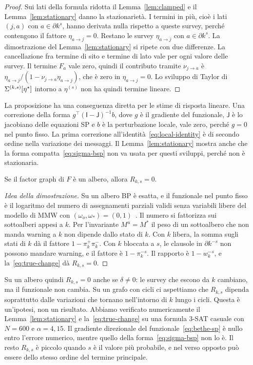 \begin{proof}
Sui lati della formula ridotta il Lemma~\ref{lem:clamped} e il Lemma~\ref{lem:stationary} danno la stazionarietà.
I termini in più, cioè i lati $(j,a)$ con $a\in\partial k^{s}$, hanno derivata nulla rispetto a queste survey, perché contengono il fattore $\eta_{a\to j}=0$.
Restano le survey $\eta_{a\to j}$ con $a\in\partial k^{s}$.
La dimostrazione del Lemma~\ref{lem:stationary} si ripete con due differenze.
La cancellazione fra termine di sito e termine di lato vale per ogni valore delle survey.
Il termine $F_a$ vale zero, quindi il contributo tramite $\nu_{j\to a}$ è $\eta_{a\to j}/(1-\nu_{j\to a}\eta_{a\to j})$, che è zero in $\eta_{a\to j}=0$.
Lo sviluppo di Taylor di $\Sigma^{(k,s)}[\eta^\star]$ intorno a $\eta^{(s)}$ non ha quindi termine lineare.
\end{proof}

La proposizione ha una conseguenza diretta per le stime di risposta lineare.
Una correzione della forma $g^{\top}(\mathsf I-\mathsf J)^{-1}b$, dove $g$ è il gradiente del funzionale, $\mathsf J$ è lo jacobiano delle equazioni SP e $b$ è la perturbazione locale, vale zero, perché $g=0$ nel punto fisso.
La prima correzione all'identità~\eqref{eq:local-identity} è di secondo ordine nella variazione dei messaggi.
Il Lemma~\ref{lem:stationary} mostra anche che la forma compatta~\eqref{eq:sigma-bsp} non va usata per questi sviluppi, perché non è stazionaria.

\begin{corollario}[Alberi]
\label{cor:tree}
Se il factor graph di $F$ è un albero, allora $R_{k,s}=0$.
\end{corollario}

\begin{proof}[Idea della dimostrazione]
Su un albero BP è esatta, e il funzionale nel punto fisso è il logaritmo del numero di assegnamenti parziali validi senza variabili libere del modello di MMW con $(\omega_o,\omega_*)=(0,1)$~\citep{braunstein2004surveybp,maneva2007survey}.
Il numero si fattorizza sui sottoalberi appesi a $k$.
Per l'invariante $M^u=M^*$ il peso di un sottoalbero che non manda warning a $k$ non dipende dallo stato di $k$.
Con $k$ libera, la somma sugli stati di $k$ dà il fattore $1-\pi_k^+\pi_k^-$.
Con $k$ bloccata a $s$, le clausole in $\partial k^{-s}$ non possono mandare warning, e il fattore è $1-\pi_k^{-s}$.
Il rapporto è $1-w_k^{-s}$, e la~\eqref{eq:true-change} dà $R_{k,s}=0$.
\end{proof}

Su un albero quindi $R_{k,s}=0$ anche se $\delta\ne0$: le survey che escono da $k$ cambiano, ma il funzionale non cambia.
Su un grafo con cicli ci aspettiamo che $R_{k,s}$ dipenda soprattutto dalle variazioni che tornano nell'intorno di $k$ lungo i cicli.
Questa è un'ipotesi, non un risultato.
Abbiamo verificato numericamente il Lemma~\ref{lem:stationary} e la~\eqref{eq:true-change} su una formula 3-SAT casuale con $N=600$ e $\alpha=4{,}15$.
Il gradiente direzionale del funzionale~\eqref{eq:bethe-sp} è nullo entro l'errore numerico, mentre quello della forma~\eqref{eq:sigma-bsp} non lo è.
Il resto $R_{k,s}$ è piccolo quando $s$ è il valore più probabile, e nel verso opposto può essere dello stesso ordine del termine principale.

